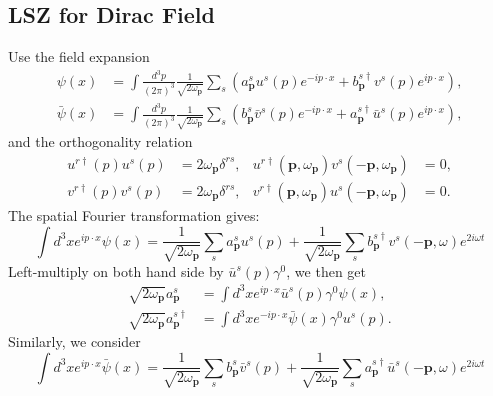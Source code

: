 \subsection{LSZ for Dirac Field}
Use the field expansion
\begin{equation}
\begin{aligned}
	\psi(x) &=\int \frac{d^{3} p}{(2 \pi)^{3}} \frac{1}{\sqrt{2 \omega_{\mathbf{p}}}} 
		\sum_{s}\left(a_{\mathbf{p}}^{s} u^{s}(p) e^{-i p \cdot x}
		+b_{\mathbf{p}}^{s \dagger} v^{s}(p) e^{i p \cdot x}\right), \\
	\bar{\psi}(x) &=\int \frac{d^{3} p}{(2 \pi)^{3}} \frac{1}{\sqrt{2 \omega_{\mathbf{p}}}} 
		\sum_{s}\left(b_{\mathbf{p}}^{s} \bar{v}^{s}(p) e^{-i p \cdot x}
		+a_{\mathbf{p}}^{s \dagger} \bar{u}^{s}(p) e^{i p \cdot x}\right),
\end{aligned}
\end{equation}
and the orthogonality relation
\begin{equation}
\begin{aligned}
	u^{r \dagger}(p) u^{s}(p) &= 2 \omega_{\bm p} \delta^{r s}, & 
	u^{r \dagger}(\bm p,\omega_{\bm p}) v^{s}(-\bm p,\omega_{\bm p}) &= 0,\\
	v^{r \dagger}(p) v^{s}(p) &= 2\omega_{\bm p} \delta^{r s}, & 
	v^{r \dagger}(\bm p,\omega_{\bm p}) u^{s}(-\bm p,\omega_{\bm p}) &= 0.
\end{aligned}
\end{equation}
The spatial Fourier transformation gives:
\begin{equation}
	\int d^3x e^{ip\cdot x}\psi(x) = \frac{1}{\sqrt{2\omega_{\bm p}}}\sum_s a^s_{\bm p}u^s(p) +\frac{1}{\sqrt{2\omega_{\bm p}}}\sum_s b^{s \dagger}_{\bm p} v^s(-\bm p,\omega) e^{2i\omega t}
\end{equation}
Left-multiply on both hand side by $\bar u^{s}(p) \gamma^0$, we then get
\begin{equation}
\begin{aligned}
	\sqrt{2\omega_{\bm p}}a^{s}_{\bm p} &= \int d^3 x e^{ip\cdot x}\bar u^{s}(p)\gamma^0 \psi(x), \\
	\sqrt{2\omega_{\bm p}}a^{s \dagger}_{\bm p} &= \int d^3 x e^{-ip\cdot x}\bar\psi(x)\gamma^0 u^{s}(p).
\end{aligned}
\end{equation}
Similarly, we consider
\begin{equation}
	\int d^3x e^{ip\cdot x}\bar\psi(x) = \frac{1}{\sqrt{2\omega_{\bm p}}}\sum_s b^s_{\bm p}\bar v^s(p) +\frac{1}{\sqrt{2\omega_{\bm p}}}\sum_s a^{s \dagger}_{\bm p} \bar u^s(-\bm p,\omega) e^{2i\omega t}
\end{equation}
